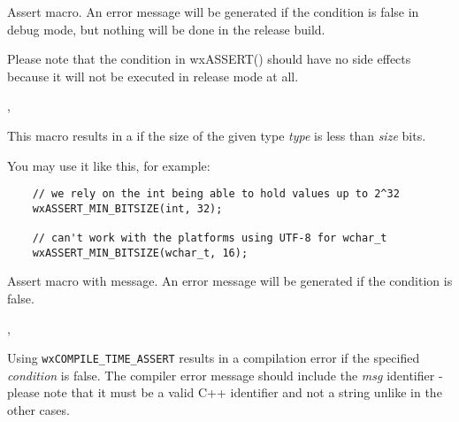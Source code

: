 \label{wxassert}


Assert macro. An error message will be generated if the condition is false in
debug mode, but nothing will be done in the release build.

Please note that the condition in wxASSERT() should have no side effects
because it will not be executed in release mode at all.


,\\


\label{wxassertminbitsize}


This macro results in a
 if the size
of the given type {\it type} is less than {\it size} bits.

You may use it like this, for example:

\begin{verbatim}
    // we rely on the int being able to hold values up to 2^32
    wxASSERT_MIN_BITSIZE(int, 32);

    // can't work with the platforms using UTF-8 for wchar_t
    wxASSERT_MIN_BITSIZE(wchar_t, 16);
\end{verbatim}


\label{wxassertmsg}


Assert macro with message. An error message will be generated if the condition is false.


,\\


\label{wxcompiletimeassert}


Using {\tt wxCOMPILE\_TIME\_ASSERT} results in a compilation error if the
specified {\it condition} is false. The compiler error message should include
the {\it msg} identifier - please note that it must be a valid C++ identifier
and not a string unlike in the other cases.

